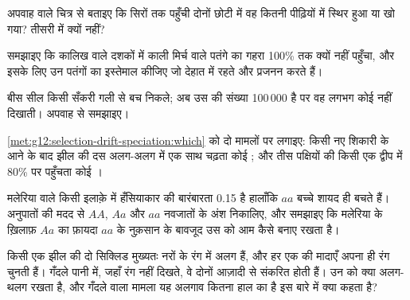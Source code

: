\begin{exercise}[$\star\star$]\label{exo:g12:selection-drift-speciation:8}
अपवाह वाले चित्र से बताइए कि सिरों तक पहुँची दोनों छोटी  में वह
 कितनी पीढ़ियों में स्थिर हुआ या खो गया? तीसरी में क्यों नहीं?
\end{exercise}

\begin{exercise}[$\star\star$]\label{exo:g12:selection-drift-speciation:9}
समझाइए कि कालिख वाले दशकों में काली मिर्च वाले पतंगे का गहरा 
100\% तक क्यों नहीं पहुँचा, और इसके लिए उन पतंगों का इस्तेमाल कीजिए जो
देहात में रहते और प्रजनन करते हैं।
\end{exercise}

\begin{exercise}[$\star\star$]\label{exo:g12:selection-drift-speciation:10}
बीस सील किसी सँकरी गली से बच निकले; अब उस  की संख्या 100\,000 है पर वह
लगभग कोई  नहीं दिखाती। अपवाह से समझाइए।
\end{exercise}

\begin{exercise}[$\star\star$]\label{exo:g12:selection-drift-speciation:11}
\cref{met:g12:selection-drift-speciation:which} को दो मामलों पर लगाइए: किसी
नए शिकारी के आने के बाद झील की दस अलग-अलग  में एक साथ चढ़ता कोई
; और तीस पक्षियों की किसी एक द्वीप  में 80\% पर पहुँचता
कोई ।
\end{exercise}

\begin{exercise}[$\star\star\star$]\label{exo:g12:selection-drift-speciation:12}
मलेरिया वाले किसी इलाक़े में हँसियाकार  की बारंबारता 0.15 है
हालाँकि $aa$ बच्चे शायद ही बचते हैं।  अनुपातों की मदद से $AA$,
$Aa$ और $aa$ नवजातों के अंश निकालिए, और समझाइए कि मलेरिया के ख़िलाफ़ $Aa$
का फ़ायदा $aa$ के नुक़सान के बावजूद उस  को आम कैसे बनाए रखता
है।
\end{exercise}

\begin{exercise}[$\star\star\star$]\label{exo:g12:selection-drift-speciation:13}
किसी एक झील की दो सिक्लिड  मुख्यतः नरों के रंग में अलग हैं, और हर
एक की मादाएँ अपना ही रंग चुनती हैं। गँदले पानी में, जहाँ रंग नहीं दिखते, वे
दोनों आज़ादी से संकरित होती हैं। उन  को क्या अलग-थलग रखता है, और
गँदले वाला मामला यह अलगाव कितना हाल का है इस बारे में क्या कहता है?
\end{exercise}


